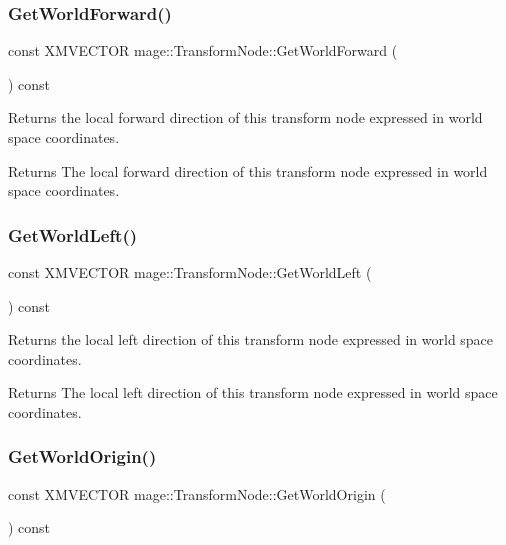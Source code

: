\subsubsection{\texorpdfstring{Get\+World\+Forward()}{GetWorldForward()}}
{\footnotesize\ttfamily const X\+M\+V\+E\+C\+T\+OR mage\+::\+Transform\+Node\+::\+Get\+World\+Forward (\begin{DoxyParamCaption}{ }\end{DoxyParamCaption}) const}

Returns the local forward direction of this transform node expressed in world space coordinates.

\begin{DoxyReturn}{Returns}
The local forward direction of this transform node expressed in world space coordinates. 
\end{DoxyReturn}
\hypertarget{classmage_1_1_transform_node_a0a53b7d31fab72be41a6a6d789428d09}{}\label{classmage_1_1_transform_node_a0a53b7d31fab72be41a6a6d789428d09} 
\subsubsection{\texorpdfstring{Get\+World\+Left()}{GetWorldLeft()}}
{\footnotesize\ttfamily const X\+M\+V\+E\+C\+T\+OR mage\+::\+Transform\+Node\+::\+Get\+World\+Left (\begin{DoxyParamCaption}{ }\end{DoxyParamCaption}) const}

Returns the local left direction of this transform node expressed in world space coordinates.

\begin{DoxyReturn}{Returns}
The local left direction of this transform node expressed in world space coordinates. 
\end{DoxyReturn}
\hypertarget{classmage_1_1_transform_node_aba58cc38ebed3fef3bd537fbb09e329a}{}\label{classmage_1_1_transform_node_aba58cc38ebed3fef3bd537fbb09e329a} 
\subsubsection{\texorpdfstring{Get\+World\+Origin()}{GetWorldOrigin()}}
{\footnotesize\ttfamily const X\+M\+V\+E\+C\+T\+OR mage\+::\+Transform\+Node\+::\+Get\+World\+Origin (\begin{DoxyParamCaption}{ }\end{DoxyParamCaption}) const}

